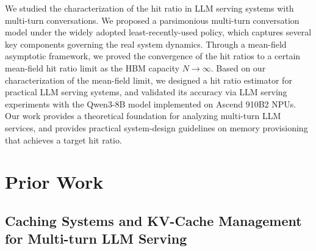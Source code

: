 \documentclass{article}
\theoremstyle{definition}
\newcommand{\chutong}[1]{[\textcolor{red}{Chutong: #1}]}
\begin{document}
We studied the characterization of the hit ratio in LLM serving systems with multi-turn conversations.   
We proposed a parsimonious multi-turn conversation model under the widely adopted least-recently-used policy, which captures several key components governing the real system dynamics. Through a mean-field asymptotic framework, we proved the convergence of the hit ratios to a certain mean-field hit ratio limit as the HBM capacity $N\to \infty$. Based on our characterization of the mean-field limit, we designed a hit ratio estimator for practical LLM serving systems, and validated its accuracy via LLM serving experiments with the Qwen3-8B model implemented on Ascend 910B2 NPUs. Our work provides a theoretical foundation for analyzing multi-turn LLM services, and provides practical system-design guidelines on memory provisioning that achieves a target hit ratio. 











\appendix

\section{Prior Work}
\label{sec: prior work}


\subsection{Caching Systems and KV-Cache Management for Multi-turn LLM Serving}
\end{document}
